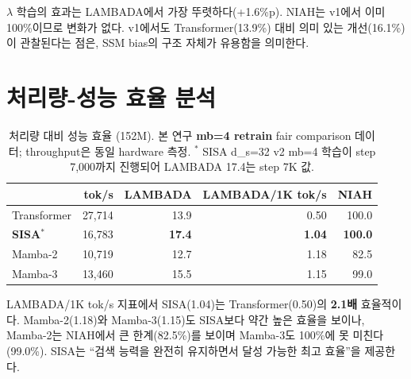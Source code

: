 \documentclass[11pt]{article}
\begin{document}
$\lambda$ 학습의 효과는 LAMBADA에서 가장 뚜렷하다(+1.6\%p). NIAH는 v1에서 이미 100\%이므로 변화가 없다. v1에서도 Transformer(13.9\%) 대비 의미 있는 개선(16.1\%)이 관찰된다는 점은, SSM bias의 구조 자체가 유용함을 의미한다.

\section{처리량-성능 효율 분석}

\begin{table}[h]
\centering\small
\caption{처리량 대비 성능 효율 (152M). 본 연구 \textbf{mb=4 retrain} fair comparison 데이터; throughput은 동일 hardware 측정. $^*$ SISA d_s=32 v2 mb=4 학습이 step 7,000까지 진행되어 LAMBADA 17.4는 step 7K 값.}
\begin{tabular}{lrrrr}
\toprule
& \textbf{tok/s} & \textbf{LAMBADA} & \textbf{LAMBADA/1K tok/s} & \textbf{NIAH} \\
\midrule
Transformer & 27,714 & 13.9 & 0.50 & 100.0 \\
\textbf{SISA}$^*$ & 16,783 & \textbf{17.4} & \textbf{1.04} & \textbf{100.0} \\
Mamba-2 & 10,719 & 12.7 & 1.18 & 82.5 \\
Mamba-3 & 13,460 & 15.5 & 1.15 & 99.0 \\
\bottomrule
\end{tabular}
\end{table}

LAMBADA/1K tok/s 지표에서 SISA(1.04)는 Transformer(0.50)의 \textbf{2.1배} 효율적이다. Mamba-2(1.18)와 Mamba-3(1.15)도 SISA보다 약간 높은 효율을 보이나, Mamba-2는 NIAH에서 큰 한계(82.5\%)를 보이며 Mamba-3도 100\%에 못 미친다(99.0\%). SISA는 ``검색 능력을 완전히 유지하면서 달성 가능한 최고 효율''을 제공한다.
\end{document}
